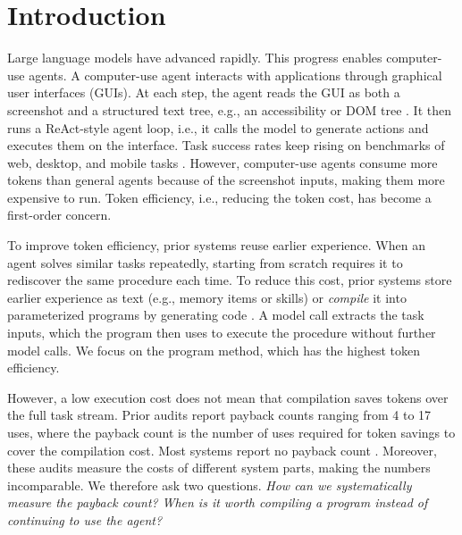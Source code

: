 

\section{Introduction}
\label{sec:intro}

Large language models have advanced rapidly.
This progress enables computer-use agents.
A computer-use agent interacts with applications through graphical user interfaces (GUIs).
At each step, the agent reads the GUI as both a screenshot and a structured text tree, e.g., an accessibility or DOM tree \citep{hong2024cogagent,zhang2025ufo}.
It then runs a ReAct-style \citep{yao2023react} agent loop, i.e., it calls the model to generate actions and executes them on the interface.
Task success rates keep rising on benchmarks of web, desktop, and mobile tasks \citep{zhou2024webarena,xie2024osworld,rawles2025androidworld}.
However, computer-use agents consume more tokens than general agents because of the screenshot inputs, making them more expensive to run.
Token efficiency, i.e., reducing the token cost, has become a first-order concern.

To improve token efficiency, prior systems reuse earlier experience.
When an agent solves similar tasks repeatedly, starting from scratch requires it to rediscover the same procedure each time.
To reduce this cost, prior systems store earlier experience as text (e.g., memory items or skills) \citep{wang2025awm,zheng2024synapse} or \textit{compile} it into parameterized programs by generating code \citep{wang2025asi,li2026preact,chen2026autorpa,elyadouni2026tracecompiler}.
A model call extracts the task inputs, which the program then uses to execute the procedure without further model calls.
We focus on the program method, which has the highest token efficiency.

However, a low execution cost does not mean that compilation saves tokens over the full task stream.
Prior audits report payback counts ranging from 4 \citep{chen2026autorpa} to 17 \citep{trooskens2026compiledai} uses, where the payback count is the number of uses required for token savings to cover the compilation cost.
Most systems report no payback count \citep{elyadouni2026tracecompiler,xu2026skillsmith}.
Moreover, these audits measure the costs of different system parts, making the numbers incomparable.
We therefore ask two questions.
\emph{How can we systematically measure the payback count?}
\emph{When is it worth compiling a program instead of continuing to use the agent?}

